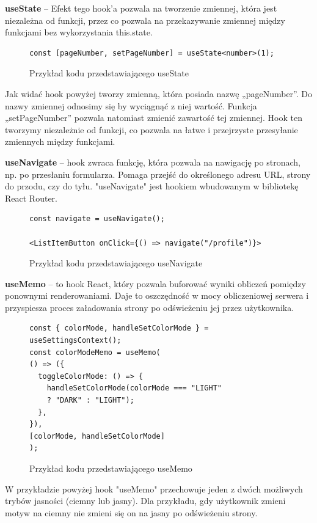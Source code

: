 \documentclass[a4paper,twoside,12pt]{book}
\begin{document}
\textbf{useState} -- Efekt tego hook’a pozwala na tworzenie zmiennej, która jest niezależna od funkcji, przez co pozwala na przekazywanie zmiennej między funkcjami bez wykorzystania this.state.


\begin{figure}[H]
    \begin{lstlisting}
const [pageNumber, setPageNumber] = useState<number>(1);
    \end{lstlisting}
    \caption{Przykład kodu przedstawiającego useState}
    \label{fig:pseudokod:listings}
\end{figure}

Jak widać hook powyżej tworzy zmienną, która posiada nazwę  „pageNumber”. Do nazwy zmiennej odnosimy się by wyciągnąć z niej wartość. Funkcja „setPageNumber” pozwala natomiast zmienić zawartość tej zmiennej. Hook ten tworzymy niezależnie od funkcji, co pozwala na łatwe i przejrzyste przesyłanie zmiennych między funkcjami.


\textbf{useNavigate} -- hook zwraca funkcję, która pozwala na nawigację po stronach, np. po przesłaniu formularza. Pomaga przejść do określonego adresu URL, strony do przodu, czy do tyłu. "useNavigate" jest hookiem wbudowanym w bibliotekę React Router.

\begin{figure}[H]
    \begin{lstlisting}
const navigate = useNavigate();

<ListItemButton onClick={() => navigate("/profile")}>
    \end{lstlisting}
    \caption{Przykład kodu przedstawiającego useNavigate}
    \label{fig:pseudokod:listings}
\end{figure}


\textbf{useMemo} -- to hook React, który pozwala buforować wyniki obliczeń pomiędzy ponownymi renderowaniami. Daje to oszczędność w mocy obliczeniowej serwera i przyspiesza proces załadowania strony po odświeżeniu jej przez użytkownika.
\begin{figure}[H]
    \begin{lstlisting}
const { colorMode, handleSetColorMode } = useSettingsContext();
const colorModeMemo = useMemo(
() => ({
  toggleColorMode: () => {
    handleSetColorMode(colorMode === "LIGHT" 
    ? "DARK" : "LIGHT");
  },
}),
[colorMode, handleSetColorMode]
);
    \end{lstlisting}
    \caption{Przykład kodu przedstawiającego useMemo}
    \label{fig:pseudokod:listings}
\end{figure}
W przykładzie powyżej  hook "useMemo" przechowuje jeden z dwóch możliwych trybów jasności (ciemny lub jasny). Dla przykładu, gdy użytkownik zmieni motyw na ciemny nie zmieni się on na jasny po odświeżeniu strony.
\end{document}
